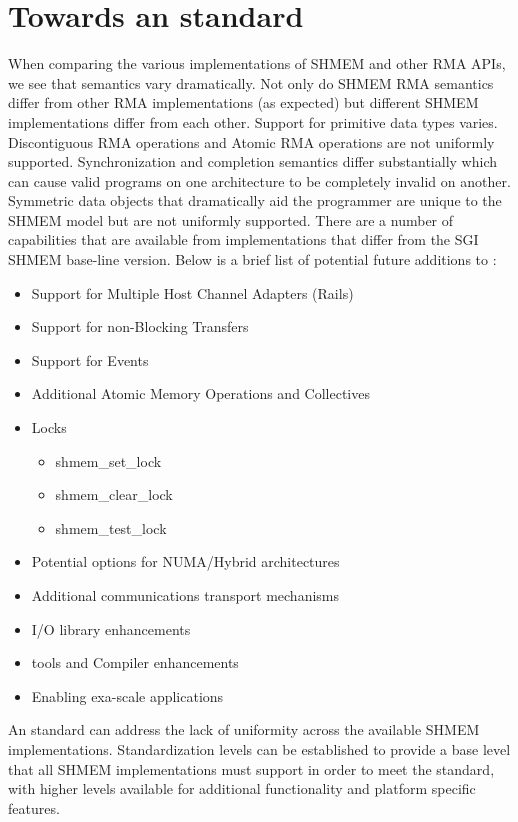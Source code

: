 \section{Towards an \openshmem standard}

When comparing the various implementations of SHMEM and other RMA APIs,
we see that semantics vary dramatically. Not only do SHMEM RMA semantics
differ from other RMA implementations (as expected)  but different SHMEM
implementations differ from each other. Support for primitive data types
varies. Discontiguous RMA operations and Atomic RMA operations are not
uniformly supported. Synchronization and completion semantics differ
substantially which can cause valid programs on one architecture to be
completely invalid on another. Symmetric data objects that dramatically
aid the programmer are unique to the SHMEM model but are not uniformly
supported. There are a number of capabilities that are available from
implementations that differ from the SGI SHMEM base-line version. Below
is a brief list of potential future additions to \openshmem:

\begin{itemize}
  \item Support for Multiple Host Channel Adapters (Rails)
  \item Support for non-Blocking Transfers
  \item Support for Events
  \item Additional Atomic Memory Operations and Collectives
  \item Locks
  \begin{itemize}
    \item shmem\_set\_lock
    \item shmem\_clear\_lock
    \item shmem\_test\_lock
  \end{itemize}
  \item Potential options for NUMA/Hybrid architectures
  \item Additional communications transport mechanisms
  \item \openshmem I/O library enhancements
  \item \openshmem tools and Compiler enhancements
  \item Enabling exa-scale applications
\end{itemize}

An \openshmem standard can address the lack of uniformity across the
available SHMEM implementations. Standardization levels can be established
to provide a base level that all SHMEM implementations must support in
order to meet the standard, with higher levels available for additional
functionality and platform specific features. \\

